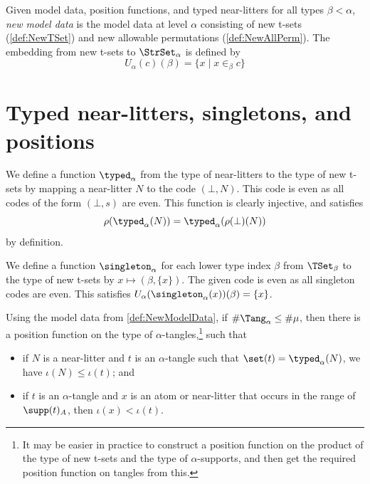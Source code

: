 \begin{definition}
  \label{def:NewModelData}
  Given model data, position functions, and typed near-litters for all types \( \beta < \alpha \), \emph{new model data} is the model data at level \( \alpha \) consisting of new t-sets (\cref{def:NewTSet}) and new allowable permutations (\cref{def:NewAllPerm}).
  The embedding from new t-sets to \( \StrSet_\alpha \) is defined by
  \[ U_\alpha(c)(\beta) = \{ x \mid x \in_\beta c \} \]
\end{definition}

\section{Typed near-litters, singletons, and positions}
\begin{definition}
  \label{def:newTypedNearLitter}
  We define a function \( \typed_\alpha \) from the type of near-litters to the type of new t-sets by mapping a near-litter \( N \) to the code \( (\bot, N) \).
  This code is even as all codes of the form \( (\bot, s) \) are even.
  This function is clearly injective, and satisfies
  \[ \rho(\typed_\alpha(N)) = \typed_\alpha(\rho(\bot)(N)) \]
  by definition.
\end{definition}
\begin{definition}[singletons]
  \label{def:newSingleton}
  We define a function \( \singleton_\alpha \) for each lower type index \( \beta \) from \( \TSet_\beta \) to the type of new t-sets by \( x \mapsto (\beta, \{x\}) \).
  The given code is even as all singleton codes are even.
  This satisfies \( U_\alpha(\singleton_\alpha(x))(\beta) = \{ x \} \).
\end{definition}
\begin{proposition}
  \label{prop:newPos}
  Using the model data from \cref{def:NewModelData}, if \( \#\Tang_\alpha \leq \#\mu \), then there is a position function on the type of \( \alpha \)-tangles,\footnote{It may be easier in practice to construct a position function on the product of the type of new t-sets and the type of \( \alpha \)-supports, and then get the required position function on tangles from this.} such that
  \begin{itemize}
    \item if \( N \) is a near-litter and \( t \) is an \( \alpha \)-tangle such that \( \set(t) = \typed_\alpha(N) \), we have \( \iota(N) \leq \iota(t) \); and
    \item if \( t \) is an \( \alpha \)-tangle and \( x \) is an atom or near-litter that occurs in the range of \( \supp(t)_A \), then \( \iota(x) < \iota(t) \).
  \end{itemize}
\end{proposition}
